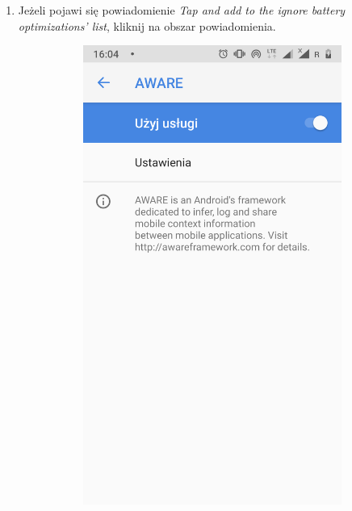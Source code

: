 \begin{enumerate}
	\item Jeżeli pojawi się powiadomienie \textit{Tap and add to the ignore battery optimizations' list}, kliknij na obszar powiadomienia.
	
	\begin{figure}[H]
		\centering
		\begin{subfigure}{0.35\textwidth}
			\centering
			\includegraphics[scale=0.14]{dodatekA/3_7.png}
			\subcaption{\label{subfigure_a}}
		\end{subfigure}

\end{figure}
\end{enumerate}
